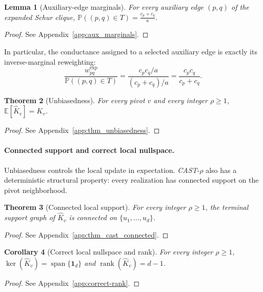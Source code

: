 \documentclass{article}
\newcommand{\CAST}{\textit{CAST}\xspace}
\newcommand{\1}{\mathbbm{1}}
\theoremstyle{plain}
\newtheorem{theorem}{Theorem}[section]
\newtheorem{lemma}[theorem]{Lemma}
\newtheorem{corollary}[theorem]{Corollary}
\renewcommand{\Pr}[1]{\mathbb{P}\left(#1\right)}
\begin{document}
\begin{lemma}[Auxiliary-edge marginals]
\label{lem:aux-marginals}
For every auxiliary edge $(p,q)$ of the expanded Schur clique,
$\Pr{(p,q)\in T}=\frac{c_p+c_q}{a}$.
\end{lemma}

\begin{proof}
See Appendix~\ref{app:aux_marginals}.
\end{proof}

In particular, the conductance assigned to a selected auxiliary edge
is exactly its inverse-marginal reweighting:
\[
\frac{w^{\mathrm{exp}}_{pq}}{\Pr{(p,q)\in T}}
=\frac{c_pc_q/a}{(c_p+c_q)/a}
=\frac{c_pc_q}{c_p+c_q}.
\]

\begin{theorem}[Unbiasedness]
\label{thm:cast-unbiased}
For every pivot $v$ and every integer $\rho\geq 1$,
$\mathbb{E}[\widehat K_v]=K_v$.
\end{theorem}

\begin{proof}
See Appendix~\ref{app:thm_unbiasedness}.
\end{proof}

\paragraph{\textbf{Connected support and correct local nullspace}.}
Unbiasedness controls the local update in expectation. \CAST-$\rho$
also has a deterministic structural property: every realization has
connected support on the pivot neighborhood.

\begin{theorem}[Connected local support]
\label{thm:cast-connected}
For every integer $\rho\geq 1$, the terminal support graph of
$\widehat K_v$ is connected on $\{u_1,\ldots,u_d\}$.
\end{theorem}

\begin{proof}
See Appendix~\ref{app:thm_cast_connected}.
\end{proof}

\begin{corollary}[Correct local nullspace and rank]
\label{cor:correct-rank}
For every integer $\rho\geq 1$,
$\ker(\widehat K_v)=\operatorname{span}\{\mathbf 1_d\}$ and
$\operatorname{rank}(\widehat K_v)=d-1$.
\end{corollary}

\begin{proof}
See Appendix~\ref{app:correct-rank}.
\end{proof}
\end{document}

